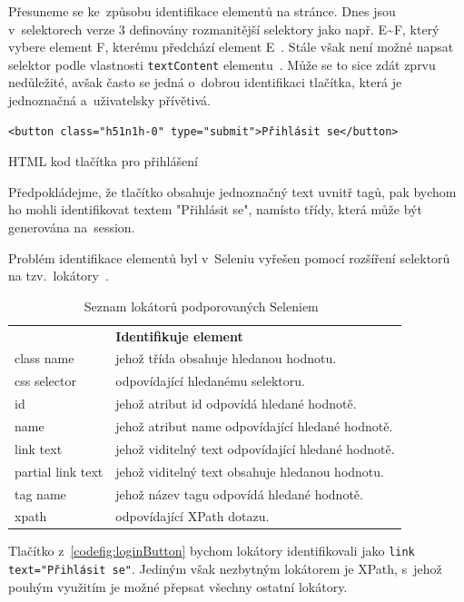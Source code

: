\documentclass[12pt, a4paper, twoside]{article}
\newcommand{\codefigureSpacing}{1.2}
\begin{document}
	\noindent Přesuneme se ke~způsobu identifikace elementů na stránce. Dnes jsou v~selektorech verze 3 definovány rozmanitější selektory jako např. E\textasciitilde F, který vybere element F, kterému předchází element E~\cite{selectors3W3c}. Stále však není možné napsat selektor podle vlastnosti \texttt{textContent} elementu~\cite{selectors4W3c}. Může se to sice zdát zprvu nedůležité, avšak často se jedná o~dobrou identifikaci tlačítka, která je jednoznačná a~uživatelsky přívětivá.
	\begin{codefigure}[H]
		\renewcommand\baselinestretch{\codefigureSpacing}
		\begin{lstlisting}[style=MyHTML]
<button class="h51n1h-0" type="submit">Přihlásit se</button>
		\end{lstlisting}
		\caption{HTML kod tlačítka pro přihlášení}
		\label{codefig:loginButton}
	\end{codefigure}
	Předpokládejme, že tlačítko obsahuje jednoznačný text uvnitř tagů, pak bychom ho mohli identifikovat textem "Přihlásit se", namísto třídy, která může být generována na~session.
	
	\newpage
	Problém identifikace elementů byl v~Seleniu vyřešen pomocí rozšíření selektorů na tzv.~lokátory~\cite{seleniumDocs}.
	{
	\begin{table}[H]
		\centering
	\begin{tabular}{ l|l }
	\rowcolor{tableHeadingBackground} \multicolumn{1}{l}{\textbf{Lokátor}} & \multicolumn{1}{l}{\textbf{Identifikuje element}} \\
	class name &  jehož třída obsahuje hledanou hodnotu.\\ 
	css selector & odpovídající hledanému selektoru. \\ 
	id & jehož atribut id odpovídá hledané hodnotě. \\
	name & jehož atribut name odpovídající hledané hodnotě. \\
	link text & jehož viditelný text odpovídající hledané hodnotě. \\
	partial link text & jehož viditelný text obsahuje hledanou hodnotu.  \\
	tag name & jehož název tagu odpovídá hledané hodnotě. \\
	xpath & odpovídající XPath dotazu. \\
	\end{tabular}
	\caption{Seznam lokátorů podporovaných Seleniem~\cite{seleniumDocs}}
	\label{tab:locatorsList}
	\end{table}
	}
	Tlačítko z~\cref{codefig:loginButton} bychom lokátory identifikovali jako \texttt{link text="Přihlásit se"}. Jediným však nezbytným lokátorem je XPath, s~jehož pouhým využitím je možné přepsat všechny ostatní lokátory.
\end{document}
